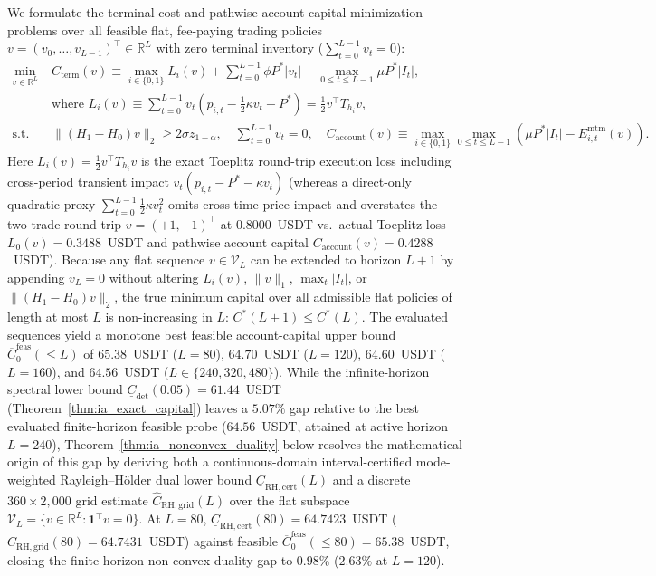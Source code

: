 \documentclass[12pt]{article}
\theoremstyle{definition}
\theoremstyle{remark}
\newcommand{\R}{\mathbb{R}}
\begin{document}
We formulate the terminal-cost and pathwise-account capital minimization problems over all feasible flat, fee-paying trading policies $v = (v_0, \dots, v_{L-1})^\top \in \R^L$ with zero terminal inventory ($\sum_{t=0}^{L-1} v_t = 0$):
\begin{equation}
\begin{aligned}
\min_{v \in \R^L} \; & C_{\mathrm{term}}(v) \equiv \max_{i \in \{0,1\}} L_i(v) + \sum_{t=0}^{L-1} \phi P^* |v_t| + \max_{0 \le t \le L-1} \mu P^* |I_t|, \\
& \text{where } L_i(v) \equiv \sum_{t=0}^{L-1} v_t \left( p_{i,t} - \frac{1}{2}\kappa v_t - P^* \right) = \frac{1}{2} v^\top T_{h_i} v, \\
\text{s.t.} \; & \|(H_1 - H_0) v\|_2 \ge 2 \sigma z_{1-\alpha}, \quad \sum_{t=0}^{L-1} v_t = 0, \quad C_{\mathrm{account}}(v) \equiv \max_{i \in \{0,1\}} \max_{0 \le t \le L-1} \left( \mu P^* |I_t| - E^{\mathrm{mtm}}_{i,t}(v) \right).
\end{aligned}
\label{eq:general_capital_optimization}
\end{equation}
Here $L_i(v) = \frac{1}{2} v^\top T_{h_i} v$ is the exact Toeplitz round-trip execution loss including cross-period transient impact $v_t(p_{i,t} - P^* - \kappa v_t)$ (whereas a direct-only quadratic proxy $\sum_{t=0}^{L-1} \frac{1}{2}\kappa v_t^2$ omits cross-time price impact and overstates the two-trade round trip $v = (+1, -1)^\top$ at $0.8000$~USDT vs.\ actual Toeplitz loss $L_0(v) = 0.3488$~USDT and pathwise account capital $C_{\mathrm{account}}(v) = 0.4288$~USDT). Because any flat sequence $v \in \mathcal{V}_L$ can be extended to horizon $L+1$ by appending $v_L = 0$ without altering $L_i(v)$, $\|v\|_1$, $\max_t |I_t|$, or $\|(H_1 - H_0)v\|_2$, the true minimum capital over all admissible flat policies of length at most $L$ is non-increasing in $L$: $C^*(L+1) \le C^*(L)$. The evaluated sequences yield a monotone best feasible account-capital upper bound $\overline{C}_0^{\mathrm{feas}}(\le L)$ of $65.38$~USDT ($L=80$), $64.70$~USDT ($L=120$), $64.60$~USDT ($L=160$), and $64.56$~USDT ($L \in \{240, 320, 480\}$). While the infinite-horizon spectral lower bound $\underline{C}_{\mathrm{det}}(0.05) = 61.44$~USDT (Theorem~\ref{thm:ia_exact_capital}) leaves a $5.07\%$ gap relative to the best evaluated finite-horizon feasible probe ($64.56$~USDT, attained at active horizon $L=240$), Theorem~\ref{thm:ia_nonconvex_duality} below resolves the mathematical origin of this gap by deriving both a continuous-domain interval-certified mode-weighted Rayleigh--H\"older dual lower bound $\underline{C}_{\mathrm{RH,cert}}(L)$ and a discrete $360 \times 2{,}000$ grid estimate $\hat{C}_{\mathrm{RH,grid}}(L)$ over the flat subspace $\mathcal{V}_L = \{v \in \mathbb{R}^L : \mathbf{1}^\top v = 0\}$. At $L=80$, $\underline{C}_{\mathrm{RH,cert}}(80) = 64.7423$~USDT ($\hat{C}_{\mathrm{RH,grid}}(80) = 64.7431$~USDT) against feasible $\overline{C}_0^{\mathrm{feas}}(\le 80) = 65.38$~USDT, closing the finite-horizon non-convex duality gap to $0.98\%$ ($2.63\%$ at $L=120$).
\end{document}
